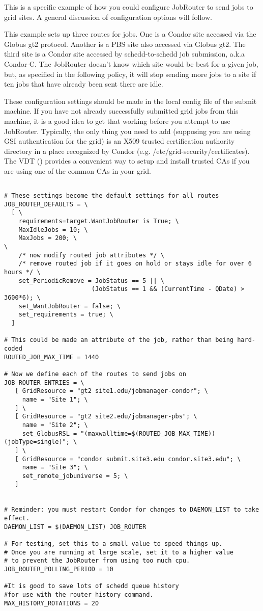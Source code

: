 This is a specific example of how you could configure JobRouter to send
jobs to grid sites.  A general discussion of configuration options
will follow.

This example sets up three routes for jobs.  One is a Condor site
accessed via the Globus gt2 protocol.  Another is a PBS site also
accessed via Globus gt2.  The third site is a Condor site accessed by
schedd-to-schedd job submission, a.k.a Condor-C.  The JobRouter
doesn't know which site would be best for a given job, but, as
specified in the following policy, it will stop sending more jobs to a
site if ten jobs that have already been sent there are idle.

These configuration settings should be made in the local config file
of the submit machine.  If you have not already successfully submitted
grid jobs from this machine, it is a good idea to get that working
before you attempt to use JobRouter.  Typically, the only thing you
need to add (supposing you are using GSI authentication for the grid)
is an X509 trusted certification authority directory in a place
recognized by Condor (e.g. /etc/grid-security/certificates).  The VDT
() provides a convenient way to setup and
install trusted CAs if you are using one of the common CAs in your
grid.

\begin{verbatim}

# These settings become the default settings for all routes
JOB_ROUTER_DEFAULTS = \
  [ \
    requirements=target.WantJobRouter is True; \
    MaxIdleJobs = 10; \
    MaxJobs = 200; \
\
    /* now modify routed job attributes */ \
    /* remove routed job if it goes on hold or stays idle for over 6 hours */ \
    set_PeriodicRemove = JobStatus == 5 || \
                        (JobStatus == 1 && (CurrentTime - QDate) > 3600*6); \
    set_WantJobRouter = false; \
    set_requirements = true; \
  ]

# This could be made an attribute of the job, rather than being hard-coded
ROUTED_JOB_MAX_TIME = 1440

# Now we define each of the routes to send jobs on
JOB_ROUTER_ENTRIES = \
   [ GridResource = "gt2 site1.edu/jobmanager-condor"; \
     name = "Site 1"; \
   ] \
   [ GridResource = "gt2 site2.edu/jobmanager-pbs"; \
     name = "Site 2"; \
     set_GlobusRSL = "(maxwalltime=$(ROUTED_JOB_MAX_TIME))(jobType=single)"; \
   ] \
   [ GridResource = "condor submit.site3.edu condor.site3.edu"; \
     name = "Site 3"; \
     set_remote_jobuniverse = 5; \
   ]


# Reminder: you must restart Condor for changes to DAEMON_LIST to take effect.
DAEMON_LIST = $(DAEMON_LIST) JOB_ROUTER

# For testing, set this to a small value to speed things up.
# Once you are running at large scale, set it to a higher value
# to prevent the JobRouter from using too much cpu.
JOB_ROUTER_POLLING_PERIOD = 10

#It is good to save lots of schedd queue history
#for use with the router_history command.
MAX_HISTORY_ROTATIONS = 20
\end{verbatim}


